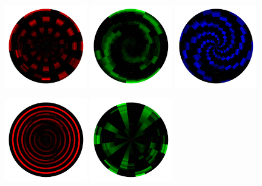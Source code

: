 \begin{figure}[h!]
    \begin{center}
        \includegraphics[width=0.32\textwidth]{figures/appendix_featurevis/spread_12.pdf}
        \includegraphics[width=0.32\textwidth]{figures/appendix_featurevis/spread_20.pdf}
        \includegraphics[width=0.32\textwidth]{figures/appendix_featurevis/spread_33.pdf}
    \end{center}
    \begin{center}
        \includegraphics[width=0.32\textwidth]{figures/appendix_featurevis/spread_0.pdf}
        \includegraphics[width=0.32\textwidth]{figures/appendix_featurevis/spread_23.pdf}

\end{center}
\end{figure}
